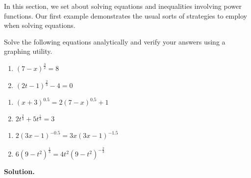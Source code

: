 \documentclass{ximera}
\begin{document}
	\author{Stitz-Zeager}




\setcounter{footnote}{0}

\label{PowerEqIneq}

In this section, we set about solving equations and inequalities involving power functions.  Our first example demonstrates the usual sorts of strategies to employ when solving equations.

\begin{ex} \label{powerequationex}  Solve the following equations analytically and verify your answers using a graphing utility.


\begin{multicols}{2}
\begin{enumerate}

\item \label{first} $(7-x)^{\frac{3}{2}} = 8$ 
\item \label{second} $(2t-1)^{\frac{2}{3}} -4 = 0$

\setcounter{HW}{\value{enumi}}
\end{enumerate}
\end{multicols}

\begin{multicols}{2}
\begin{enumerate}
\setcounter{enumi}{\value{HW}}

\item $(x+3)^{0.5} = 2(7-x)^{0.5}+1$ 
\item $2t^{\frac{2}{3}} + 5t^{\frac{1}{3}} = 3$

\setcounter{HW}{\value{enumi}}
\end{enumerate}
\end{multicols}


\begin{multicols}{2}
\begin{enumerate}
\setcounter{enumi}{\value{HW}}

\item $2(3x-1)^{-0.5}  = 3x (3x-1)^{-1.5}$ 
\item $6(9-t^2)^{\frac{1}{3}} = 4t^2 (9-t^2)^{-\frac{2}{3}}$

\setcounter{HW}{\value{enumi}}
\end{enumerate}
\end{multicols}

{\bf Solution.}

\begin{enumerate}


\end{enumerate}
\end{ex}
\end{document}
